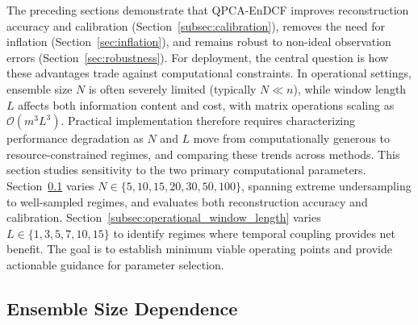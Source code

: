 \documentclass[11pt,a4paper]{article}
\begin{document}
The preceding sections demonstrate that QPCA-EnDCF improves reconstruction accuracy and calibration (Section~\ref{subsec:calibration}), removes the need for inflation (Section~\ref{sec:inflation}), and remains robust to non-ideal observation errors (Section~\ref{sec:robustness}). For deployment, the central question is how these advantages trade against computational constraints. In operational settings, ensemble size $N$ is often severely limited (typically $N \ll n$), while window length $L$ affects both information content and cost, with matrix operations scaling as $\mathcal{O}(m^3L^3)$. Practical implementation therefore requires characterizing performance degradation as $N$ and $L$ move from computationally generous to resource-constrained regimes, and comparing these trends across methods. This section studies sensitivity to the two primary computational parameters. Section~\ref{subsec:operational_ensemble_size} varies $N \in \{5,10,15,20,30,50,100\}$, spanning extreme undersampling to well-sampled regimes, and evaluates both reconstruction accuracy and calibration. Section~\ref{subsec:operational_window_length} varies $L \in \{1,3,5,7,10,15\}$ to identify regimes where temporal coupling provides net benefit. The goal is to establish minimum viable operating points and provide actionable guidance for parameter selection.

\subsection{Ensemble Size Dependence}
\label{subsec:operational_ensemble_size}
\end{document}
